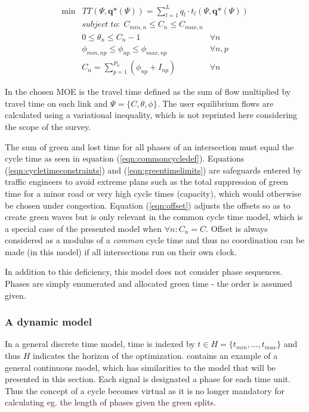 \begin{eqnarray}
\min & TT(\Psi, \textbf{q*}\left( \Psi\right)) = \displaystyle\sum_{l = 1}^{L} q_l \cdot t_l(\Psi,\textbf{q*}(\Psi))
\end{eqnarray}
\begin{eqnarray}
\label{eqn:cycletimeconstraints} subject\;to:\;C_{min,n} \leq C_n \leq C_{max,n} & \\
\label{eqn:offset} 0 \leq \theta_n \leq C_n-1 & \forall n \\
\label{eqn:greentimelimits} \phi_{min,np} \leq \phi_{np} \leq \phi_{max,np} & \forall n,p \\
\label{eqn:commoncycledef} C_n = \sum_{p=1}^{P_n} ( \phi_{np} + I_{np} ) & \forall n
\end{eqnarray}

In \cite{2} the chosen MOE is the travel time defined as the sum of flow
multiplied by travel time on each link and $\Psi = \lbrace
C,\theta,\phi \rbrace$. The user equilibrium flows are calculated
using a variational inequality, which is not reprinted here
considering the scope of the survey.

The sum of green and lost time for all phases of an intersection must
equal the cycle time as seen in equation
(\ref{eqn:commoncycledef}). Equations (\ref{eqn:cycletimeconstraints})
and (\ref{eqn:greentimelimits}) are safeguards entered by traffic
engineers to avoid extreme plans such as the total suppression of green
time for a minor road or very high cycle times (capacity), which would
otherwise be chosen under congestion. Equation (\ref{eqn:offset})
adjusts the offsets so as to create green waves but is only relevant
in the common cycle time model, which is a special case of the
presented model when $\forall n : C_n = C$. Offset is always
considered as a modulus of a \textit{common} cycle time and thus no
coordination can be made (in this model) if all intersections run on
their own clock.

In addition to this deficiency, this model does not consider phase
sequences. Phases are simply enumerated and allocated green time - the
order is assumed given.

\subsubsection*{A dynamic model}
\label{sec:dynamicmodel}

In a general discrete time model, time is indexed by $t \in H = \lbrace
t_{min},...,t_{max} \rbrace$ and thus $H$ indicates the horizon of the
optimization. \cite{36} contains an example of a general
continuous model, which has similarities to the  model that
will be presented in this section. Each signal is designated a phase
for each time unit. Thus the concept of a cycle becomes virtual as
it is no longer mandatory for calculating eg. the length of phases
given the green splits.

